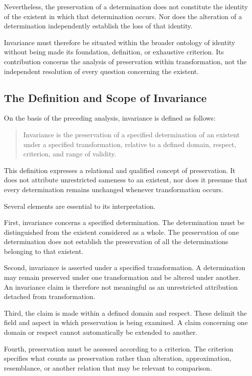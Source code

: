 Nevertheless, the preservation of a determination does
not constitute the identity of the existent in which
that determination occurs. Nor does the alteration of
a determination independently establish the loss of
that identity.

Invariance must therefore be situated within the broader
ontology of identity without being made its foundation,
definition, or exhaustive criterion. Its contribution
concerns the analysis of preservation within transformation,
not the independent resolution of every question
concerning the existent.

\subsection{The Definition and Scope of Invariance}

On the basis of the preceding analysis, invariance is
defined as follows:

\begin{quote}
Invariance is the preservation of a specified
determination of an existent under a specified
transformation, relative to a defined domain,
respect, criterion, and range of validity.
\end{quote}

This definition expresses a relational and qualified
concept of preservation. It does not attribute
unrestricted sameness to an existent, nor does it
presume that every determination remains unchanged
whenever transformation occurs.

Several elements are essential to its interpretation.

First, invariance concerns a specified determination.
The determination must be distinguished from the
existent considered as a whole. The preservation of
one determination does not establish the preservation
of all the determinations belonging to that existent.

Second, invariance is asserted under a specified
transformation. A determination may remain preserved
under one transformation and be altered under another.
An invariance claim is therefore not meaningful as
an unrestricted attribution detached from transformation.

Third, the claim is made within a defined domain and
respect. These delimit the field and aspect in which
preservation is being examined. A claim concerning
one domain or respect cannot automatically be extended
to another.

Fourth, preservation must be assessed according to
a criterion. The criterion specifies what counts as
preservation rather than alteration, approximation,
resemblance, or another relation that may be relevant
to comparison.

